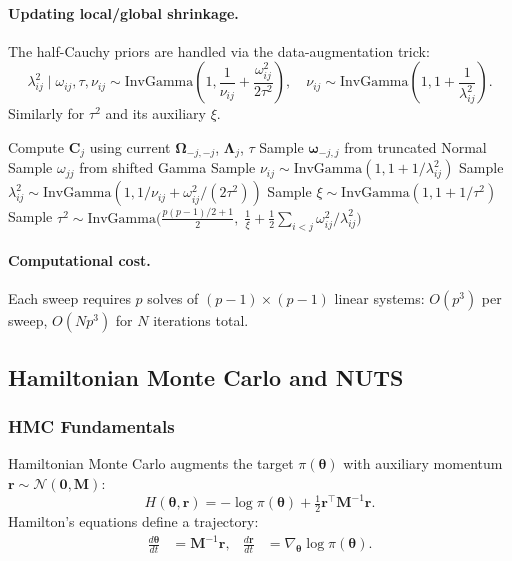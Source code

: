 \documentclass[11pt,a4paper]{article}
\newcommand{\Normal}{\mathcal{N}}
\newcommand{\bOmega}{\bm{\Omega}}
\begin{document}
\paragraph{Updating local/global shrinkage.} The half-Cauchy priors are handled via the data-augmentation trick:
\begin{equation}
  \lambda_{ij}^2 \mid \omega_{ij}, \tau, \nu_{ij} \sim \text{InvGamma}\!\left(1, \frac{1}{\nu_{ij}} + \frac{\omega_{ij}^2}{2\tau^2}\right), \quad
  \nu_{ij} \sim \text{InvGamma}\!\left(1, 1 + \frac{1}{\lambda_{ij}^2}\right).
\end{equation}
Similarly for $\tau^2$ and its auxiliary $\xi$.

\begin{algorithm}
\caption{Graphical Horseshoe Gibbs Sampler (one sweep)}
\label{alg:gibbs}
\begin{algorithmic}[1]
  \State Compute $\bm{C}_j$ using current $\bOmega_{-j,-j}$, $\bm{\Lambda}_j$, $\tau$
  \State Sample $\bm{\omega}_{-j,j}$ from truncated Normal
  \State Sample $\omega_{jj}$ from shifted Gamma
\EndFor
{}
  \State Sample $\nu_{ij} \sim \text{InvGamma}(1, 1+1/\lambda_{ij}^2)$
  \State Sample $\lambda_{ij}^2 \sim \text{InvGamma}(1, 1/\nu_{ij} + \omega_{ij}^2/(2\tau^2))$
\EndFor
\State Sample $\xi \sim \text{InvGamma}(1, 1 + 1/\tau^2)$
\State Sample $\tau^2 \sim \text{InvGamma}\!\big(\frac{p(p-1)/2+1}{2},\; \frac{1}{\xi} + \frac{1}{2}\sum_{i<j}\omega_{ij}^2/\lambda_{ij}^2\big)$
\end{algorithmic}
\end{algorithm}

\paragraph{Computational cost.} Each sweep requires $p$ solves of $(p{-}1)\times(p{-}1)$ linear systems: $O(p^3)$ per sweep, $O(Np^3)$ for $N$ iterations total.

\subsection{Hamiltonian Monte Carlo and NUTS}

\subsubsection{HMC Fundamentals}

Hamiltonian Monte Carlo augments the target $\pi(\bm{\theta})$ with auxiliary momentum $\bm{r} \sim \Normal(\bm{0},\bm{M})$:
\begin{equation}
  H(\bm{\theta},\bm{r}) = -\log\pi(\bm{\theta}) + \tfrac{1}{2}\bm{r}^\top\bm{M}^{-1}\bm{r}.
\end{equation}
Hamilton's equations define a trajectory:
\begin{align}
  \frac{d\bm{\theta}}{dt} &= \bm{M}^{-1}\bm{r}, &
  \frac{d\bm{r}}{dt} &= \nabla_{\bm{\theta}}\log\pi(\bm{\theta}).
\end{align}
\end{document}
